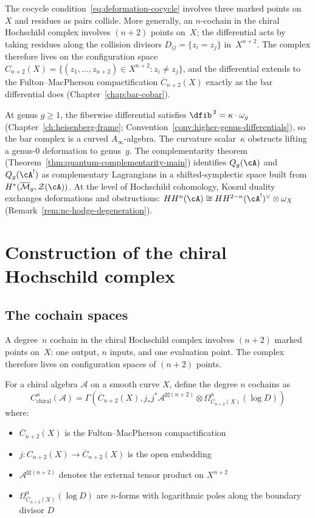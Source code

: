 The cocycle condition~\eqref{eq:deformation-cocycle} involves three
marked points on~$X$ and residues as pairs collide.  More generally,
an $n$-cochain in the chiral Hochschild complex involves $(n+2)$
points on~$X$; the differential acts by taking residues along the
collision divisors $D_{ij}=\{z_i=z_j\}$ in~$X^{n+2}$.  The complex
therefore lives on the configuration space
$C_{n+2}(X)=\{(z_1,\ldots,z_{n+2})\in X^{n+2}: z_i\neq z_j\}$,
and the differential extends to the Fulton--MacPherson
compactification $\overline{C}_{n+2}(X)$ exactly as the bar
differential does (Chapter~\ref{chap:bar-cobar}).

At genus $g\geq 1$, the fiberwise differential satisfies
$\dfib^{\,2}=\kappa\cdot\omega_g$
(Chapter~\ref{ch:heisenberg-frame};
Convention~\ref{conv:higher-genus-differentials}), so the bar complex
is a curved $A_\infty$-algebra.  The curvature scalar~$\kappa$
obstructs lifting a genus-$0$ deformation to genus~$g$.  The
complementarity theorem
(Theorem~\ref{thm:quantum-complementarity-main}) identifies
$Q_g(\cA)$ and $Q_g(\cA^!)$ as complementary Lagrangians in a
shifted-symplectic space built from
$H^*(\overline{\mathcal{M}}_g,\mathcal{Z}(\cA))$.  At the level of
Hochschild cohomology, Koszul duality exchanges deformations and
obstructions:
$HH^n(\cA)\cong HH^{2-n}(\cA^!)^\vee\otimes\omega_X$
(Remark~\ref{rem:nc-hodge-degeneration}).

\section{Construction of the chiral Hochschild complex}

\subsection{The cochain spaces}

A degree~$n$ cochain in the chiral Hochschild complex involves $(n+2)$ marked points on~$X$: one output, $n$ inputs, and one evaluation point.  The complex therefore lives on configuration spaces of $(n+2)$ points.

\begin{definition}
For a chiral algebra $\mathcal{A}$ on a smooth curve $X$, define the degree $n$ cochains as
\[
C^n_{\text{chiral}}(\mathcal{A}) = \Gamma\left(\overline{C}_{n+2}(X), j_*j^*\mathcal{A}^{\boxtimes (n+2)} \otimes \Omega^n_{\overline{C}_{n+2}(X)}(\log D)\right)
\]
where:
\begin{itemize}
\item $\overline{C}_{n+2}(X)$ is the Fulton--MacPherson compactification
\item $j: C_{n+2}(X) \to \overline{C}_{n+2}(X)$ is the open embedding
\item $\mathcal{A}^{\boxtimes (n+2)}$ denotes the external tensor product on $X^{n+2}$
\item $\Omega^n_{\overline{C}_{n+2}(X)}(\log D)$ are $n$-forms with logarithmic poles along the boundary divisor $D$
\end{itemize}
\end{definition}

